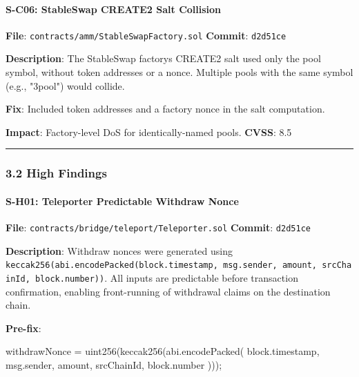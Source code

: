 \documentclass[
]{article}
\newenvironment{Shaded}{}{}
\newcommand{\NormalTok}[1]{#1}
\begin{document}
\paragraph{S-C06: StableSwap CREATE2 Salt
Collision}\label{s-c06-stableswap-create2-salt-collision}

\textbf{File}: \texttt{contracts/amm/StableSwapFactory.sol}
\textbf{Commit}: \texttt{d2d51ce}

\textbf{Description}: The StableSwap factory\textquotesingle s CREATE2
salt used only the pool symbol, without token addresses or a nonce.
Multiple pools with the same symbol (e.g., "3pool") would collide.

\textbf{Fix}: Included token addresses and a factory nonce in the salt
computation.

\textbf{Impact}: Factory-level DoS for identically-named pools.
\textbf{CVSS}: 8.5

\begin{center}\rule{0.5\linewidth}{0.5pt}\end{center}

\subsubsection{3.2 High Findings}\label{32-high-findings}

\paragraph{S-H01: Teleporter Predictable Withdraw
Nonce}\label{s-h01-teleporter-predictable-withdraw-nonce}

\textbf{File}: \texttt{contracts/bridge/teleport/Teleporter.sol}
\textbf{Commit}: \texttt{d2d51ce}

\textbf{Description}: Withdraw nonces were generated using
\texttt{keccak256(abi.encodePacked(block.timestamp,\ msg.sender,\ amount,\ srcChainId,\ block.number))}.
All inputs are predictable before transaction confirmation, enabling
front-running of withdrawal claims on the destination chain.

\textbf{Pre-fix}:

\begin{Shaded}
\begin{Highlighting}[]
\NormalTok{withdrawNonce = uint256(keccak256(abi.encodePacked(}
\NormalTok{    block.timestamp, msg.sender, amount, srcChainId, block.number}
\NormalTok{)));}
\end{Highlighting}
\end{Shaded}
\end{document}
